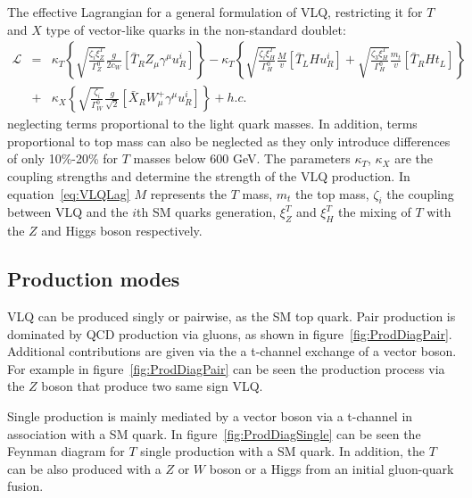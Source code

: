 The effective Lagrangian for a general formulation of VLQ, restricting it for $T$ and $X$ type of vector-like quarks in the non-standard doublet:
\begin{eqnarray}
  \mathcal{L} & = & \kappa_{T}\left\{ \sqrt{\frac{\zeta_{i}\xi_{Z}^{T}}{\Gamma_{Z}^{0}}}\frac{g}{2c_{W}}\left[ \bar{T}_{R}Z_{\mu}\gamma^{\mu}u^{i}_{R}\right]\right\} 
               -  \kappa_{T}\left\{ \sqrt{\frac{\zeta_{i}\xi_{H}^{T}}{\Gamma_{H}^{0}}}\frac{M}{v}\left[ \bar{T}_{L}Hu^{i}_{R}\right] + \sqrt{\frac{\zeta_{3}\xi_{H}^{T}}{\Gamma_{H}^{0}}}\frac{m_{t}}{v}\left[ \bar{T}_{R}Ht_{L}\right]\right\} \nonumber\\            
              & + & \kappa_{X}\left\{ \sqrt{\frac{\zeta_{i}}{\Gamma_{W}^{0}}}\frac{g}{\sqrt{2}}\left[ \bar{X}_{R}W^{+}_{\mu}\gamma^{\mu}u^{i}_{R}\right]\right\} +h.c.
\label{eq:VLQLag}
\end{eqnarray} 
neglecting terms proportional to the light quark masses. In addition, terms proportional to top mass can also be neglected as they only introduce differences of only 10\%-20\% for $T$ masses below 600 GeV. The parameters $\kappa_T$, $\kappa_X$ are the coupling strengths and determine the strength of the VLQ production. In equation~\ref{eq:VLQLag} $M$ represents the $T$ mass, $m_{t}$ the top mass, $\zeta_{i}$ the coupling between VLQ and the $i$th SM quarks generation, $\xi_{Z}^{T}$ and $\xi_{H}^{T}$  the mixing of $T$ with the $Z$ and Higgs boson respectively. 

\subsection{Production modes}
\label{sec:prod}

VLQ can be produced singly or pairwise, as the SM top quark. Pair production is dominated by QCD production via gluons, as shown in figure~\ref{fig:ProdDiagPair}. Additional contributions are given via the a t-channel exchange of a vector boson. For example in figure~\ref{fig:ProdDiagPair} can be seen the production process via the $Z$ boson that produce two same sign VLQ.   

Single production is mainly mediated by a vector boson via a t-channel in association with a SM quark. In figure~\ref{fig:ProdDiagSingle} can be seen the Feynman diagram for $T$ single production with a SM quark. In addition, the $T$ can be also produced with a $Z$ or $W$ boson or a Higgs from an initial gluon-quark fusion. 

